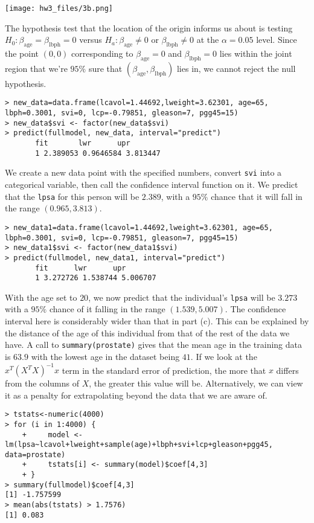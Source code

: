 \documentclass{article}
\begin{document}
\texttt{[image: hw3\_files/3b.png]}

The hypothesis test that the location of the origin informs us about is testing $H_0:\beta_\text{age}=\beta_\text{lbph}=0$ versus $H_a:\beta_\text{age}\neq0\text{ or }\beta_\text{lbph}\neq0$ at the $\alpha=0.05$ level. Since the point $(0,0)$ corresponding to $\beta_\text{age}=0$ and $\beta_\text{lbph}=0$ lies within the joint region that we're $95\%$ sure that $(\beta_\text{age},\beta_\text{lbph})$ lies in, we cannot reject the null hypothesis.
\begin{verbatim}
> new_data=data.frame(lcavol=1.44692,lweight=3.62301, age=65, lbph=0.3001, svi=0, lcp=-0.79851, gleason=7, pgg45=15)
> new_data$svi <- factor(new_data$svi)
> predict(fullmodel, new_data, interval="predict")
       fit       lwr      upr
       1 2.389053 0.9646584 3.813447
\end{verbatim}

We create a new data point with the specified numbers, convert \verb|svi| into a categorical variable, then call the confidence interval function on it. We predict that the \verb|lpsa| for this person will be $2.389$, with a $95\%$ chance that it will fall in the range $(0.965,3.813)$.
\begin{verbatim}
> new_data1=data.frame(lcavol=1.44692,lweight=3.62301, age=65, lbph=0.3001, svi=0, lcp=-0.79851, gleason=7, pgg45=15)
> new_data1$svi <- factor(new_data1$svi)
> predict(fullmodel, new_data1, interval="predict")
       fit      lwr      upr
       1 3.272726 1.538744 5.006707
\end{verbatim}

With the age set to $20$, we now predict that the individual's \verb|lpsa| will be $3.273$ with a $95\%$ chance of it falling in the range $(1.539, 5.007)$. The confidence interval here is considerably wider than that in part (c). This can be explained by the distance of the age of this individual from that of the rest of the data we have. A call to \verb|summary(prostate)| gives that the mean age in the training data is $63.9$ with the lowest age in the dataset being $41$. If we look at the $x^T(X^TX)^{-1}x$ term in the standard error of prediction, the more that $x$ differs from the columns of $X$, the greater this value will be. Alternatively, we can view it as a penalty for extrapolating beyond the data that we are aware of.
\begin{verbatim}
> tstats<-numeric(4000)
> for (i in 1:4000) {
    +     model <- lm(lpsa~lcavol+lweight+sample(age)+lbph+svi+lcp+gleason+pgg45, data=prostate)
    +     tstats[i] <- summary(model)$coef[4,3]
    + }
> summary(fullmodel)$coef[4,3]
[1] -1.757599
> mean(abs(tstats) > 1.7576)
[1] 0.083
\end{verbatim}
\end{document}
